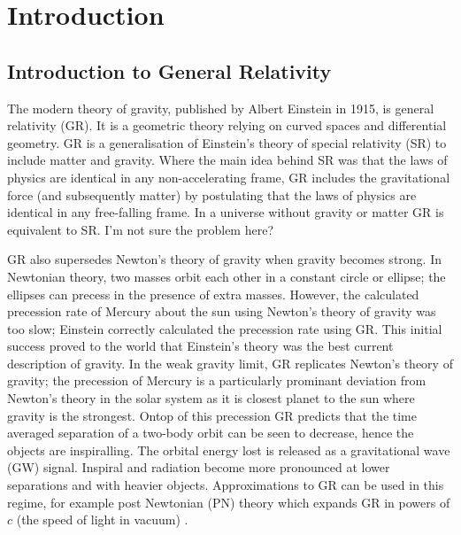 

\section{Introduction}
\subsection{Introduction to General Relativity}

The modern theory of gravity, published by Albert Einstein in 1915, is general relativity (GR). It is a geometric theory relying on curved spaces and differential geometry. GR is a generalisation of Einstein's theory of special relativity (SR) to include matter and gravity. Where the main idea behind SR was that the laws of physics are identical in any non-accelerating frame, GR includes the gravitational force (and subsequently matter) by postulating that the laws of physics are identical in any free-falling frame. In a universe without gravity or matter GR is equivalent to SR. {\color{choral} I'm not sure the problem here? }

GR also supersedes Newton's theory of gravity when gravity becomes strong. In Newtonian theory, two masses orbit each other in a constant circle or ellipse; the ellipses can precess in the presence of extra masses. However, the calculated precession rate of Mercury about the sun using Newton's theory of gravity was too slow; Einstein correctly calculated the precession rate using GR. This initial success proved to the world that Einstein's theory was the best current description of gravity. In the weak gravity limit, GR replicates Newton's theory of gravity; the precession of Mercury is a particularly prominant deviation from Newton's theory in the solar system as it is closest planet to the sun where gravity is the strongest. { \color{orchid} Ontop of this precession GR predicts that the time averaged separation of a two-body orbit can be seen to decrease, hence the objects are inspiralling. The orbital energy lost is released as a gravitational wave (GW) signal. Inspiral and radiation become more pronounced at lower separations and with heavier objects. Approximations to GR can be used in this regime, for example post Newtonian (PN) theory which expands GR in powers of $c$ (the speed of light in vacuum) . }

